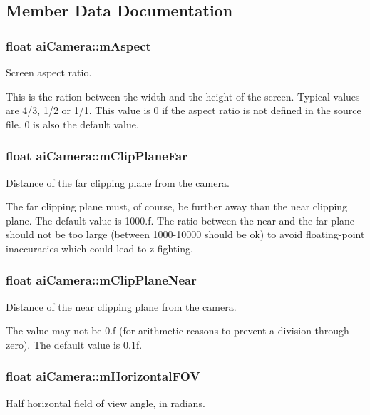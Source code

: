 \subsection{Member Data Documentation}
\hypertarget{structai_camera_ae414556eaa6f910b5927f465d97bf70c}{
\subsubsection[{m\-Aspect}]{\setlength{\rightskip}{0pt plus 5cm}float ai\-Camera\-::m\-Aspect}}\label{structai_camera_ae414556eaa6f910b5927f465d97bf70c}
Screen aspect ratio.

This is the ration between the width and the height of the screen. Typical values are 4/3, 1/2 or 1/1. This value is 0 if the aspect ratio is not defined in the source file. 0 is also the default value. \hypertarget{structai_camera_aa9ccf77e3d7ca3dc8f46df931b65172f}{
\subsubsection[{m\-Clip\-Plane\-Far}]{\setlength{\rightskip}{0pt plus 5cm}float ai\-Camera\-::m\-Clip\-Plane\-Far}}\label{structai_camera_aa9ccf77e3d7ca3dc8f46df931b65172f}
Distance of the far clipping plane from the camera.

The far clipping plane must, of course, be further away than the near clipping plane. The default value is 1000.\-f. The ratio between the near and the far plane should not be too large (between 1000-\/10000 should be ok) to avoid floating-\/point inaccuracies which could lead to z-\/fighting. \hypertarget{structai_camera_a720e8c94c036dcefe4b13cc1c69c521e}{
\subsubsection[{m\-Clip\-Plane\-Near}]{\setlength{\rightskip}{0pt plus 5cm}float ai\-Camera\-::m\-Clip\-Plane\-Near}}\label{structai_camera_a720e8c94c036dcefe4b13cc1c69c521e}
Distance of the near clipping plane from the camera.

The value may not be 0.\-f (for arithmetic reasons to prevent a division through zero). The default value is 0.\-1f. \hypertarget{structai_camera_adcdea73ece19ea0a9068f5544ec23592}{
\subsubsection[{m\-Horizontal\-F\-O\-V}]{\setlength{\rightskip}{0pt plus 5cm}float ai\-Camera\-::m\-Horizontal\-F\-O\-V}}\label{structai_camera_adcdea73ece19ea0a9068f5544ec23592}
Half horizontal field of view angle, in radians.

